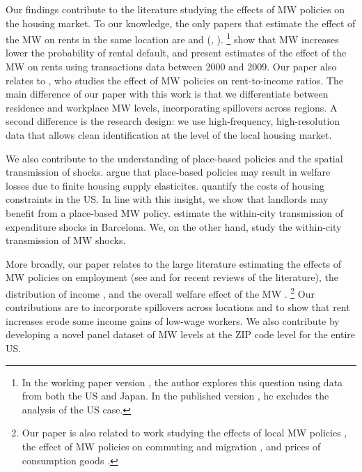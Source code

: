 
Our findings contribute to the literature studying the effects of MW policies 
on the housing market.
To our knowledge, the only papers that estimate the effect of the MW on rents 
in the same location are \textcite{Tidemann2018} and \citeauthor{Yamagishi2019} 
(\cite*{Yamagishi2019}, \cite*{Yamagishi2021}).%
\footnote{In the working paper version \parencite{Yamagishi2019}, the author 
explores this question using data from both the US and Japan.
In the published version \parencite{Yamagishi2021}, he excludes the analysis of 
the US case.}
\textcite{AgarwalEtAl2021} show that MW increases lower the probability of 
rental default, and present estimates of the effect of the MW on rents using 
transactions data between 2000 and 2009.
Our paper also relates to \textcite{Hughes2020}, who studies the effect of 
MW policies on rent-to-income ratios.
The main difference of our paper with this work is that we differentiate 
between residence and workplace MW levels, incorporating spillovers across 
regions.
A second difference is the research design: we use high-frequency,
high-resolution data that allows clean identification at the level of the local 
housing market.

We also contribute to the understanding of place-based policies and the spatial 
transmission of shocks.
\textcite{KlineMoretti2014} argue that place-based policies may result in 
welfare losses due to finite housing supply elasticites.
\textcite{HsiehMoretti2019} quantify the costs of housing constraints in the US.
In line with this insight, we show that landlords may benefit from a place-based 
MW policy.
\textcite{AllenEtAl2020} estimate the within-city transmission of expenditure 
shocks in Barcelona.
We, on the other hand, study the within-city transmission of MW shocks.

More broadly, our paper relates to the large literature estimating the effects
of MW policies on employment
(see \cite{Dube2019} and \cite{NeumarkShirley2021} for recent reviews of the 
literature), 
the distribution of income \parencite[e.g.,][]{Lee1999, AutorEtAl2016, 
Dube2019Income}, 
and the overall welfare effect of the MW \parencite{AhlfeldtEtAl2022,
BergerHerkenhoffMongey2022}.%
\footnote{Our paper is also related to work studying 
the effects of local MW policies 
\parencite[e.g.,][]{DubeLindner2021, JardimEtAl2022seattle}, 
the effect of MW policies on commuting and migration 
\parencite[e.g.,]{Cadena2014, Monras2019, PerezPerez2021}, 
and prices of consumption goods 
\parencite[e.g.,]{AllegrettoReich2018, Leung2021}.}
Our contributions are to incorporate spillovers across locations 
\parencite[as in the recent work by][]{JardimEtAl2022discontinuity} and to show 
that rent increases erode some income gains of low-wage workers.
We also contribute by developing a novel panel dataset of MW levels at the 
ZIP code level for the entire US.

